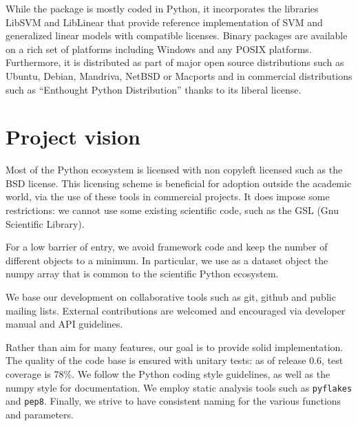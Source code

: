 \documentclass[twoside,11pt]{article}
\begin{document}
While the package is mostly coded in Python, it incorporates the
libraries LibSVM \citep{chang2001} and LibLinear \citep{fan2008} that
provide reference implementation of SVM and generalized linear models
with compatible licenses.
%
Binary packages are available on a rich set of platforms including
Windows and any POSIX platforms. Furthermore, it is distributed as part
of major open source distributions such as Ubuntu, Debian, Mandriva,
NetBSD or Macports and in commercial distributions such as ``Enthought
Python Distribution'' thanks to its liberal license.




\section {Project vision}

%
Most of the Python ecosystem is licensed with non copyleft licensed such
as the BSD license. This licensing scheme is beneficial for adoption
outside the academic world, via the use of these tools in commercial
projects. It does impose some restrictions: we cannot use some existing
scientific code, such as the GSL (Gnu Scientific Library).

\smallskip {}
%
For a low barrier of entry, we avoid framework code and keep the number
of different objects to a minimum. In particular, we use as a dataset
object the numpy array \citep{Vanderwalt2011} that is common to the
scientific Python ecosystem.

\smallskip
{}
%
We base our development on collaborative tools such as git, github and
public mailing lists. External contributions are welcomed and
encouraged via developer manual and API guidelines.

\smallskip {}
%
Rather than aim for many features, our goal is to provide solid
implementation. The quality of the code base is ensured with unitary
tests: as of release 0.6, test coverage is 78\%. We follow the Python
coding style guidelines, as well as the numpy style for documentation. We
employ static analysis tools such as {\tt pyflakes} and {\tt pep8}.
Finally, we strive to have consistent naming for the various functions
and parameters.
\end{document}
